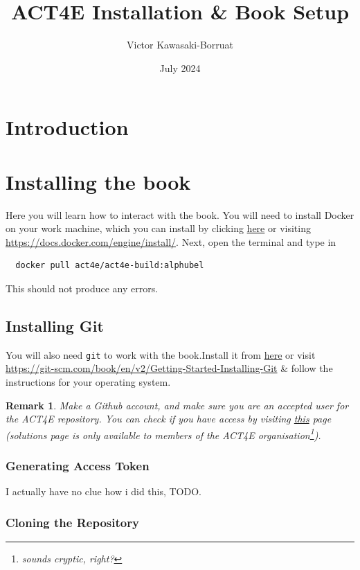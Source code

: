 \documentclass{article}
\title{ACT4E Installation \& Book Setup}
\author{Victor Kawasaki-Borruat}
\date{July 2024}
\newtheorem{remark}{Remark}
\begin{document}
\maketitle

\section{Introduction}


\section{Installing the book}
Here you will learn how to interact with the book. You will need to install Docker on your work machine, which you can install by clicking  \href{https://docs.docker.com/engine/install/}{here} or visiting \url{https://docs.docker.com/engine/install/}. Next, open the terminal and type in
\begin{verbatim}
  docker pull act4e/act4e-build:alphubel
\end{verbatim}
This should not produce any errors.


\subsection{Installing Git}
You will also need \texttt{git} to work with the book.Install it from \href{https://git-scm.com/book/en/v2/Getting-Started-Installing-Git}{here} or visit \url{https://git-scm.com/book/en/v2/Getting-Started-Installing-Git} \& follow the instructions for your operating system.

\begin{remark}
    Make a Github account, and make sure you are an accepted user for the ACT4E repository. You can check if you have access by visiting \href{https://github.com/ACT4E/ACT4E-solutions}{this} page (solutions page is only available to members of the ACT4E organisation\footnote{sounds cryptic, right?}).
\end{remark}

\subsubsection{Generating Access Token}
I actually have no clue how i did this, TODO.

\subsubsection{Cloning the Repository}
\end{document}

